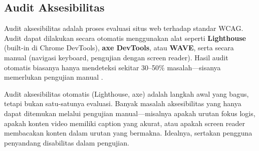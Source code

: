 \subsection{Audit Aksesibilitas}

Audit aksesibilitas adalah proses evaluasi situs web terhadap standar WCAG. Audit dapat dilakukan secara otomatis menggunakan alat seperti \textbf{Lighthouse} (built-in di Chrome DevTools), \textbf{axe DevTools}, atau \textbf{WAVE}, serta secara manual (navigasi keyboard, pengujian dengan screen reader). Hasil audit otomatis biasanya hanya mendeteksi sekitar 30--50\% masalah---sisanya memerlukan pengujian manual \cite{mdnToolsTesting}.

\begin{catatan}
Audit aksesibilitas otomatis (Lighthouse, axe) adalah langkah awal yang bagus, tetapi bukan satu-satunya evaluasi. Banyak masalah aksesibilitas yang hanya dapat ditemukan melalui pengujian manual---misalnya apakah urutan fokus logis, apakah konten video memiliki caption yang akurat, atau apakah screen reader membacakan konten dalam urutan yang bermakna. Idealnya, sertakan pengguna penyandang disabilitas dalam pengujian.
\end{catatan}
